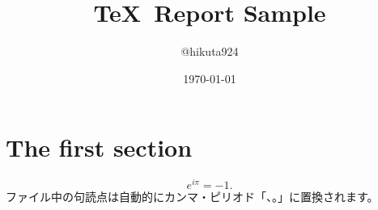 
\title{\TeX\ Report Sample}
\author{@hikuta924}
\date{\today}

\maketitle

\section{The first section}
\begin{equation}
	e^{i \pi} = -1.
\end{equation}
ファイル中の句読点は自動的にカンマ・ピリオド「、。」に置換されます。



\cite{Sam2014}



